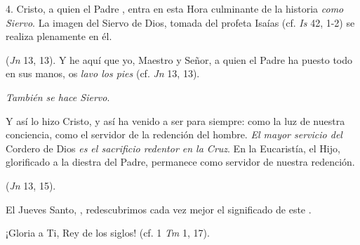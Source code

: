 \begin{body}
4. Cristo, a quien el Padre , entra en esta Hora culminante de la historia \textit{como Siervo}. La imagen del Siervo de Dios, tomada del profeta Isaías (cf. \textit{Is} 42, 1-2) se realiza plenamente en él. 

 (\textit{Jn} 13, 13). Y he aquí que yo, Maestro y Señor, a quien el Padre ha puesto todo en sus manos, os \textit{lavo los pies} (cf. \textit{Jn} 13, 13). 

\textit{También se hace Siervo}. 

Y así lo hizo Cristo, y así ha venido a ser para siempre: como la luz de nuestra conciencia, como el servidor de la redención del hombre. \textit{El mayor servicio del} Cordero de Dios \textit{es el sacrificio redentor en la Cruz}. En la Eucaristía, el Hijo, glorificado a la diestra del Padre, permanece como servidor de nuestra redención. 

 (\textit{Jn} 13, 15). 

El Jueves Santo, , redescubrimos cada vez mejor el significado de este . 

¡Gloria a Ti, Rey de los siglos! (cf. 1 \textit{Tm} 1, 17).
\end{body}

\label{b-05-01-1991H}

